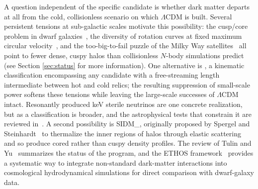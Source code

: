A question independent of the specific candidate is whether dark matter departs at all from the cold, collisionless scenario on which $\Lambda$CDM is built.
Several persistent tensions at sub-galactic scales motivate this possibility: the cusp/core problem in dwarf galaxies~\cite{Flores:1994gz,Moore:1994yx}, the diversity of rotation curves at fixed maximum circular velocity~\cite{Oman:2015xda}, and the too-big-to-fail puzzle of the Milky Way satellites~\cite{Boylan-Kolchin:2011qkt,Boylan-Kolchin:2011lmk} all point to fewer dense, cuspy halos than collisionless $N$-body simulations predict~\cite{Bullock:2017xww} (see Section \ref{sec:status} for more information).
One alternative is \emph{\WDM}, a kinematic classification encompassing any candidate with a free-streaming length intermediate between hot and cold relics; the resulting suppression of small-scale power softens these tensions while leaving the large-scale successes of $\Lambda$CDM intact.
Resonantly produced keV sterile neutrinos are one concrete realization, but \WDM as a classification is broader, and the astrophysical tests that constrain it are reviewed in~\cite{Adhikari:2022sbh}.
A second possibility is \gls{SIDM_}, originally proposed by Spergel and Steinhardt~\cite{Spergel:1999mh} to thermalize the inner regions of halos through elastic scattering and so produce cored rather than cuspy density profiles.
The review of Tulin and Yu~\cite{Tulin:2017ara} summarizes the status of the program, and the ETHOS framework~\cite{Cyr-Racine:2015ihg} provides a systematic way to integrate non-standard dark-matter interactions into cosmological hydrodynamical simulations for direct comparison with dwarf-galaxy data.

